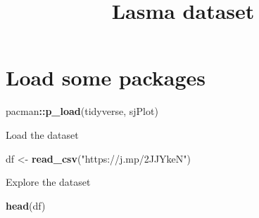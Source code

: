 \documentclass[
]{article}
\title{Lasma dataset}
\author{}
\date{\vspace{-2.5em}}
\newenvironment{Shaded}{\begin{snugshade}}{\end{snugshade}}
\newcommand{\KeywordTok}[1]{\textcolor[rgb]{0.13,0.29,0.53}{\textbf{#1}}}
\newcommand{\NormalTok}[1]{#1}
\newcommand{\OperatorTok}[1]{\textcolor[rgb]{0.81,0.36,0.00}{\textbf{#1}}}
\newcommand{\StringTok}[1]{\textcolor[rgb]{0.31,0.60,0.02}{#1}}
\begin{document}
\maketitle

\hypertarget{load-some-packages}{%
\section{Load some packages}\label{load-some-packages}}

\begin{Shaded}
\begin{Highlighting}[]
\NormalTok{pacman}\OperatorTok{::}\KeywordTok{p_load}\NormalTok{(tidyverse, }
\NormalTok{               sjPlot)}
\end{Highlighting}
\end{Shaded}

Load the dataset

\begin{Shaded}
\begin{Highlighting}[]
\NormalTok{df <-}\StringTok{ }\KeywordTok{read_csv}\NormalTok{(}\StringTok{"https://j.mp/2JJYkeN"}\NormalTok{)}
\end{Highlighting}
\end{Shaded}

Explore the dataset

\begin{Shaded}
\begin{Highlighting}[]
\KeywordTok{head}\NormalTok{(df)}
\end{Highlighting}
\end{Shaded}
\end{document}
